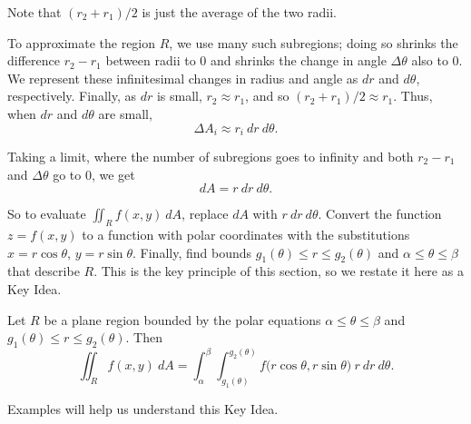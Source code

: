 Note that $(r_2+r_1)/2$ is just the average of the two radii. 

To approximate the region $R$, we use many such subregions; doing so shrinks the difference $r_2-r_1$ between radii to 0 and shrinks the change in angle $\Delta \theta$ also to 0. We represent these infinitesimal changes in radius and angle as $dr$ and $d\theta$, respectively. Finally, as $dr$ is small, $r_2\approx r_1$, and so $(r_2+r_1)/2\approx r_1$. Thus, when $dr$ and $d\theta$ are small, 
$$\Delta A_i \approx r_i\ dr\ d\theta.$$

Taking a limit, where the number of subregions goes to infinity and both $r_2-r_1$ and $\Delta\theta$ go to 0, we get $$dA = r\ dr\ d\theta.$$

So to evaluate $\iint_Rf(x,y)\ dA$, replace $dA$ with $r\ dr\ d\theta$. Convert the function $z=f(x,y)$ to a function with polar coordinates with the substitutions $x=r\cos\theta$, $y=r\sin\theta$. Finally, find bounds $g_1(\theta)\leq r\leq g_2(\theta)$ and $\alpha\leq\theta\leq\beta$ that describe $R$. This is the key principle of this section, so we restate it here as a Key Idea.

{Let $R$ be a plane region bounded by the polar equations $\alpha\leq\theta\leq\beta$ and  $g_1(\theta)\leq r\leq g_2(\theta)$. Then
$$\iint_Rf(x,y)\ dA = \int_\alpha^\beta\int_{g_1(\theta)}^{g_2(\theta)} f\big(r\cos\theta,r\sin\theta\big)\ r\ dr\ d\theta.$$
}

Examples will help us understand this Key Idea.\\


